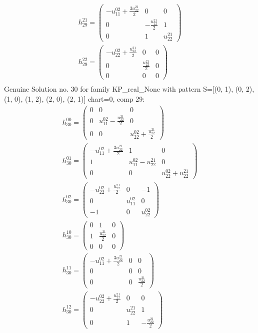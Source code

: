 \documentclass[a4paper, 11pt, twoside, onecolumn]{article}
\begin{document}
\begin{landscape}
\begin{gather*}
	 h_{29}^{21}=\begin{pmatrix}- u^{02}_{11} + \frac{3 u^{21}_{22}}{2} & 0 & 0\\0 & - \frac{u^{21}_{22}}{2} & 1\\0 & 1 & u^{21}_{22}\end{pmatrix}\\ 
	 h_{29}^{22}=\begin{pmatrix}- u^{02}_{22} + \frac{u^{21}_{22}}{2} & 0 & 0\\0 & \frac{u^{21}_{22}}{2} & 0\\0 & 0 & 0\end{pmatrix}\\ 
\end{gather*} 
Genuine Solution no. 30 for family KP_real_None with pattern S=[(0, 1), (0, 2), (1, 0), (1, 2), (2, 0), (2, 1)] chart=0, comp 29: 
\begin{gather*} 
	 h_{30}^{00}=\begin{pmatrix}0 & 0 & 0\\0 & u^{02}_{11} - \frac{u^{21}_{22}}{2} & 0\\0 & 0 & u^{02}_{22} + \frac{u^{21}_{22}}{2}\end{pmatrix}\\ 
	 h_{30}^{01}=\begin{pmatrix}- u^{02}_{11} + \frac{3 u^{21}_{22}}{2} & 1 & 0\\1 & u^{02}_{11} - u^{21}_{22} & 0\\0 & 0 & u^{02}_{22} + u^{21}_{22}\end{pmatrix}\\ 
	 h_{30}^{02}=\begin{pmatrix}- u^{02}_{22} + \frac{u^{21}_{22}}{2} & 0 & -1\\0 & u^{02}_{11} & 0\\-1 & 0 & u^{02}_{22}\end{pmatrix}\\ 
	 h_{30}^{10}=\begin{pmatrix}0 & 1 & 0\\1 & \frac{u^{21}_{22}}{2} & 0\\0 & 0 & 0\end{pmatrix}\\ 
	 h_{30}^{11}=\begin{pmatrix}- u^{02}_{11} + \frac{3 u^{21}_{22}}{2} & 0 & 0\\0 & 0 & 0\\0 & 0 & \frac{u^{21}_{22}}{2}\end{pmatrix}\\ 
	 h_{30}^{12}=\begin{pmatrix}- u^{02}_{22} + \frac{u^{21}_{22}}{2} & 0 & 0\\0 & u^{21}_{22} & 1\\0 & 1 & - \frac{u^{21}_{22}}{2}\end{pmatrix}\\ 

\end{gather*}
\end{landscape}
\end{document}
